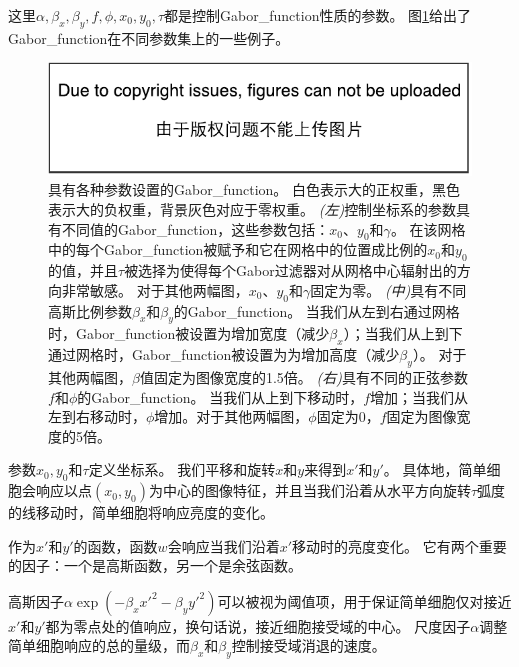 这里$\alpha, \beta_x, \beta_y, f, \phi, x_0, y_0, \tau$都是控制\gls{Gabor_function}性质的参数。
图\ref{fig:chap9_Gabor_functions}给出了\gls{Gabor_function}在不同参数集上的一些例子。
\begin{figure}
\ifOpenSource
\centerline{\includegraphics{figure.pdf}}
\else
\centering    
{}     
\fi
\captionsetup{singlelinecheck=off}
\caption{具有各种参数设置的\gls{Gabor_function}。
白色表示大的正权重，黑色表示大的负权重，背景灰色对应于零权重。
\emph{(左)}控制坐标系的参数具有不同值的\gls{Gabor_function}，这些参数包括：$x_0$、$y_0$和$\gamma$。
在该网格中的每个\gls{Gabor_function}被赋予和它在网格中的位置成比例的$x_0$和$y_0$的值，并且$\tau$被选择为使得每个Gabor过滤器对从网格中心辐射出的方向非常敏感。
对于其他两幅图，$x_0$、$y_0$和$\gamma$固定为零。
\emph{(中)}具有不同高斯比例参数$\beta_x$和$\beta_y$的\gls{Gabor_function}。
当我们从左到右通过网格时，\gls{Gabor_function}被设置为增加宽度（减少$\beta_x$）；当我们从上到下通过网格时，\gls{Gabor_function}被设置为为增加高度（减少$\beta_y$）。
对于其他两幅图，$\beta$值固定为图像宽度的1.5倍。
\emph{(右)}具有不同的正弦参数$f$和$\phi$的\gls{Gabor_function}。
当我们从上到下移动时，$f$增加；当我们从左到右移动时，$\phi$增加。对于其他两幅图，$\phi$固定为0，$f$固定为图像宽度的5倍。}     
\label{fig:chap9_Gabor_functions}     
\end{figure}

参数$x_0,y_0$和$\tau$定义坐标系。
我们平移和旋转$x$和$y$来得到$x'$和$y'$。
具体地，简单细胞会响应以点$(x_0, y_0)$为中心的图像特征，并且当我们沿着从水平方向旋转$\tau$弧度的线移动时，简单细胞将响应亮度的变化。
 
 
作为$x'$和$y'$的函数，函数$w$会响应当我们沿着$x'$移动时的亮度变化。
它有两个重要的因子：一个是高斯函数，另一个是余弦函数。

高斯因子$ \alpha \exp(-\beta_x x'^2 - \beta_y y'^2)$可以被视为阈值项，用于保证简单细胞仅对接近$x'$和$y'$都为零点处的值响应，换句话说，接近细胞接受域的中心。
尺度因子$\alpha$调整简单细胞响应的总的量级，而$\beta_x$和$\beta_y$控制接受域消退的速度。

